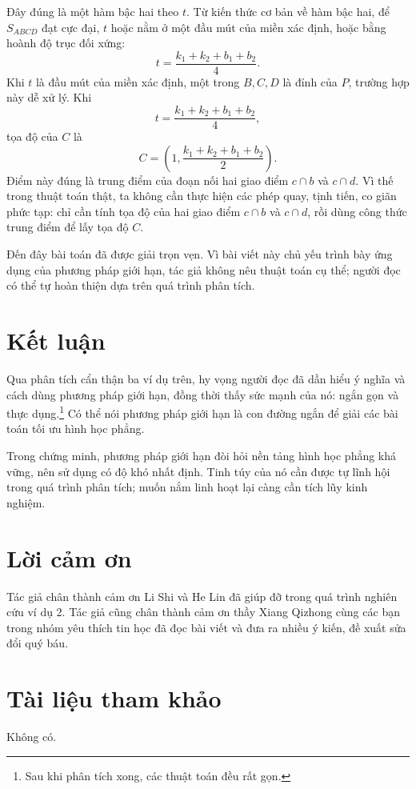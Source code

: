 \documentclass[11pt]{article}
\newcommand{\area}[1]{S_{#1}}
\begin{document}
Đây đúng là một hàm bậc hai theo \(t\). Từ kiến thức cơ bản về hàm bậc hai,
để \(\area{ABCD}\) đạt cực đại, \(t\) hoặc nằm ở một đầu mút của miền xác
định, hoặc bằng hoành độ trục đối xứng:
\[
  t=\frac{k_1+k_2+b_1+b_2}{4}.
\]
Khi \(t\) là đầu mút của miền xác định, một trong \(B,C,D\) là đỉnh của \(P\),
trường hợp này dễ xử lý. Khi
\[
  t=\frac{k_1+k_2+b_1+b_2}{4},
\]
tọa độ của \(C\) là
\[
  C=\left(1,\frac{k_1+k_2+b_1+b_2}{2}\right).
\]
Điểm này đúng là trung điểm của đoạn nối hai giao điểm \(c\cap b\) và
\(c\cap d\). Vì thế trong thuật toán thật, ta không cần thực hiện các phép
quay, tịnh tiến, co giãn phức tạp: chỉ cần tính tọa độ của hai giao điểm
\(c\cap b\) và \(c\cap d\), rồi dùng công thức trung điểm để lấy tọa độ \(C\).

Đến đây bài toán đã được giải trọn vẹn. Vì bài viết này chủ yếu trình bày ứng
dụng của phương pháp giới hạn, tác giả không nêu thuật toán cụ thể; người đọc
có thể tự hoàn thiện dựa trên quá trình phân tích.

\section{Kết luận}

Qua phân tích cẩn thận ba ví dụ trên, hy vọng người đọc đã dần hiểu ý nghĩa và
cách dùng phương pháp giới hạn, đồng thời thấy sức mạnh của nó: ngắn gọn và
thực dụng.\footnote{Sau khi phân tích xong, các thuật toán đều rất gọn.} Có
thể nói phương pháp giới hạn là con đường ngắn để giải các bài toán tối ưu
hình học phẳng.

Trong chứng minh, phương pháp giới hạn đòi hỏi nền tảng hình học phẳng khá
vững, nên sử dụng có độ khó nhất định. Tinh túy của nó cần được tự lĩnh hội
trong quá trình phân tích; muốn nắm linh hoạt lại càng cần tích lũy kinh
nghiệm.

\section*{Lời cảm ơn}

Tác giả chân thành cảm ơn Li Shi và He Lin đã giúp đỡ trong quá trình nghiên
cứu ví dụ 2. Tác giả cũng chân thành cảm ơn thầy Xiang Qizhong cùng các bạn
trong nhóm yêu thích tin học đã đọc bài viết và đưa ra nhiều ý kiến, đề xuất
sửa đổi quý báu.

\section*{Tài liệu tham khảo}

Không có.
\end{document}
